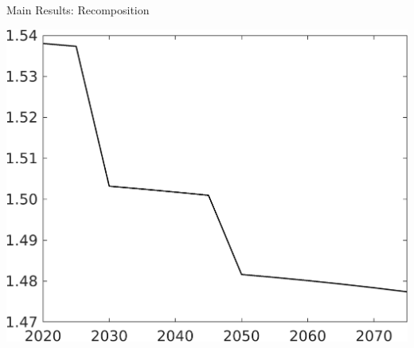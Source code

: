 \documentclass[11pt,aspectratio=169]{beamer}
\begin{document}
\begin{frame}{Main Results: Recomposition}
\begin{minipage}[]{0.32\textwidth}
\end{minipage}
\begin{minipage}[]{0.32\textwidth}
	\includegraphics[width=1\textwidth]{../codding_model/own_basedOnFried/optimalPol_elastS_DisuSci/figures/all_1705/Single_OPT_T_NoTaus_hhhl_spillover0_sep1_BN0_ineq0_red0_etaa0.79.png}
\end{minipage}


\end{frame}
\end{document}
